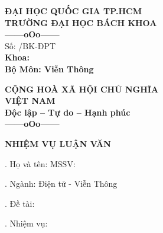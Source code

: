 
\thispagestyle{empty}

\begin{center}
\begin{minipage}[t]{0.48\textwidth}
\centering
\textbf{\small ĐẠI HỌC QUỐC GIA TP.HCM} \\
\textbf{\small TRƯỜNG ĐẠI HỌC BÁCH KHOA} \\
\vspace{0.2cm}
\textbf{\small ------oOo------} \\ %
\vspace{0.2cm}
Số: \underline{\hspace{3cm}} /BK-ĐPT \\[0.2cm]
\textbf{\small Khoa: \DEPARTMENT} \\
\textbf{\small Bộ Môn: Viễn Thông}
\end{minipage}
\hfill
\begin{minipage}[t]{0.48\textwidth}
\centering
\textbf{\small CỘNG HOÀ XÃ HỘI CHỦ NGHĨA} \\
\textbf{\small VIỆT NAM} \\
\textbf{\small Độc lập -- Tự do -- Hạnh phúc} \\
\vspace{0.2cm}
\textbf{\small ------oOo------} %
\end{minipage}
\end{center}

\vspace{0.6cm}

\begin{center}
\textbf{\large NHIỆM VỤ LUẬN VĂN}
\end{center}

\vspace{0.5cm}

. Họ và tên: \TENTACGIA \hspace{2cm} MSSV: \MSSV

\vspace{0.3cm}
. Ngành: Điện tử - Viễn Thông

\vspace{0.3cm}
. Đề tài: \TENLUANVAN

\vspace{0.3cm}
. Nhiệm vụ: \dotfill \\
\phantom{4. Nhiệm vụ: } \dotfill

